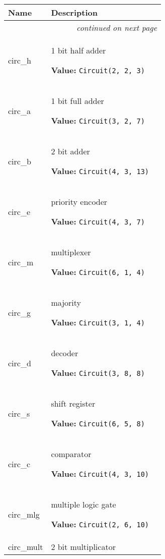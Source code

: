     \vspace{-1cm}
\hspace{\varindent}\begin{longtable}{|p{\varnamewidth}|p{\vardescrwidth}|l}
\cline{1-2}
\cline{1-2} \centering \textbf{Name} & \centering \textbf{Description}& \\
\cline{1-2}
\endhead\cline{1-2}\multicolumn{3}{r}{\small\textit{continued on next page}}\\\endfoot\cline{1-2}
\endlastfoot\raggedright c\-i\-r\-c\-\_\-h\- & \raggedright 1 bit half adder

\textbf{Value:} 
{\tt Circuit(2, 2, 3)}&\\
\cline{1-2}
\raggedright c\-i\-r\-c\-\_\-a\- & \raggedright 1 bit full adder

\textbf{Value:} 
{\tt Circuit(3, 2, 7)}&\\
\cline{1-2}
\raggedright c\-i\-r\-c\-\_\-b\- & \raggedright 2 bit adder

\textbf{Value:} 
{\tt Circuit(4, 3, 13)}&\\
\cline{1-2}
\raggedright c\-i\-r\-c\-\_\-e\- & \raggedright priority encoder

\textbf{Value:} 
{\tt Circuit(4, 3, 7)}&\\
\cline{1-2}
\raggedright c\-i\-r\-c\-\_\-m\- & \raggedright multiplexer

\textbf{Value:} 
{\tt Circuit(6, 1, 4)}&\\
\cline{1-2}
\raggedright c\-i\-r\-c\-\_\-g\- & \raggedright majority

\textbf{Value:} 
{\tt Circuit(3, 1, 4)}&\\
\cline{1-2}
\raggedright c\-i\-r\-c\-\_\-d\- & \raggedright decoder

\textbf{Value:} 
{\tt Circuit(3, 8, 8)}&\\
\cline{1-2}
\raggedright c\-i\-r\-c\-\_\-s\- & \raggedright shift register

\textbf{Value:} 
{\tt Circuit(6, 5, 8)}&\\
\cline{1-2}
\raggedright c\-i\-r\-c\-\_\-c\- & \raggedright comparator

\textbf{Value:} 
{\tt Circuit(4, 3, 10)}&\\
\cline{1-2}
\raggedright c\-i\-r\-c\-\_\-m\-l\-g\- & \raggedright multiple logic gate

\textbf{Value:} 
{\tt Circuit(2, 6, 10)}&\\
\cline{1-2}
\raggedright c\-i\-r\-c\-\_\-m\-u\-l\-t\-2\- & \raggedright 2 bit multiplicator


\end{longtable}
